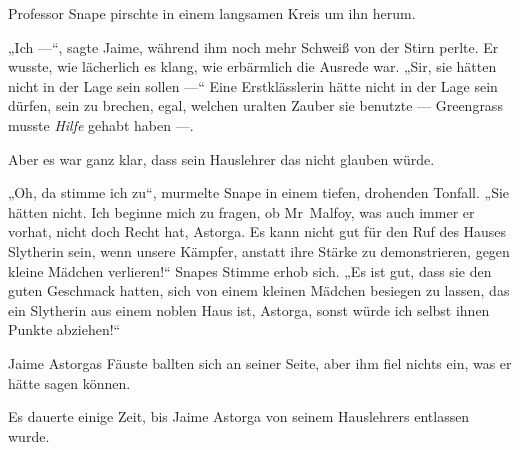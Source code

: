 Professor Snape pirschte in einem langsamen Kreis um ihn herum.

„Ich —“, sagte Jaime, während ihm noch mehr Schweiß von der Stirn perlte. Er wusste, wie lächerlich es klang, wie erbärmlich die Ausrede war.
„Sir, sie hätten nicht in der Lage sein sollen —“ Eine Erstklässlerin hätte nicht in der Lage sein dürfen, sein  zu brechen, egal, welchen uralten Zauber sie benutzte — Greengrass musste \emph{Hilfe} gehabt haben —.

Aber es war ganz klar, dass sein Hauslehrer das nicht glauben würde.

„Oh, da stimme ich zu“, murmelte Snape in einem tiefen, drohenden Tonfall.
„Sie hätten nicht. Ich beginne mich zu fragen, ob Mr~Malfoy, was auch immer er vorhat, nicht doch Recht hat, Astorga. Es kann nicht gut für den Ruf des Hauses Slytherin sein, wenn unsere Kämpfer, anstatt ihre Stärke zu demonstrieren, gegen kleine Mädchen verlieren!“ Snapes Stimme erhob sich.
„Es ist gut, dass sie den guten Geschmack hatten, sich von einem kleinen Mädchen besiegen zu lassen, das ein Slytherin aus einem noblen Haus ist, Astorga, sonst würde ich selbst ihnen Punkte abziehen!“

Jaime Astorgas Fäuste ballten sich an seiner Seite, aber ihm fiel nichts ein, was er hätte sagen können.

Es dauerte einige Zeit, bis Jaime Astorga von seinem Hauslehrers entlassen wurde.

